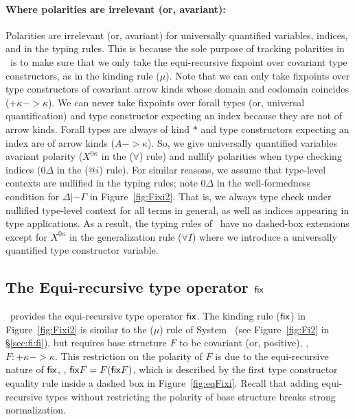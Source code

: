 \paragraph{Where polarities are irrelevant (or, avariant):}
Polarities are irrelevant (or, avariant) for universally quantified variables,
indices, and in the typing rules. This is because the sole purpose of tracking 
polarities in \Fixi\ is to make sure that we only take the equi-recursive
fixpoint over covariant type constructors, as in the kinding rule ($\mu$).
Note that we can only take fixpoints over type constructors of covariant
arrow kinds whose domain and codomain coincides ($+\kappa -> \kappa$).
We can never take fixpoints over forall types (or, universal quantification)
and type constructor expecting an index because they are not of arrow kinds.
Forall types are always of kind $*$ and type constructors expecting an index
are of arrow kinds ($A -> \kappa$). So, we give universally quantified variables
avariant polarity ($X^{0\kappa}$ in the ($\forall$) rule) and nullify polarities
when type checking indices ($0\Delta$ in the ($@i$) rule). For similar reasons,
we assume that type-level contexts are nullified in the typing rules;
note $0\Delta$ in the well-formedness condition for $\Delta |- \Gamma$
in Figure~\ref{fig:Fixi2}. That is, we always type check under nullified
type-level context for all terms in general, as well as indices appearing
in type applications. As a result, the typing rules of \Fixi\ have no dashed-box
extensions except for $X^{0\kappa}$ in the generalization rule ($\forall$$I$)
where we introduce a universally quantified type constructor variable.

\subsection{The Equi-recursive type operator $\mathsf{fix}$}
\label{ssec:fixi:def:equirec}
\Fixi\ provides the equi-recursive type operator $\mathsf{fix}$.
The kinding rule ($\mathsf{fix}$) in Figure~\ref{fig:Fixi2} is similar to
the ($\mu$) rule of System \Fi\ (see Figure~\ref{fig:Fi2} in \S\ref{sec:fi:fi}),
but requires base structure $F$ to be covariant (or, positive), \ie,
$F : +\kappa -> \kappa$. This restriction on the polarity of $F$ is due to
the equi-recursive nature of $\mathsf{fix}$, \ie, $\mathsf{fix} F=F(\mathsf{fix} F)$, which is
described by the first type constructor equality rule inside a dashed box
in Figure~\ref{fig:eqFixi}. Recall that adding equi-recursive types
without restricting the polarity of base structure breaks strong normalization.

